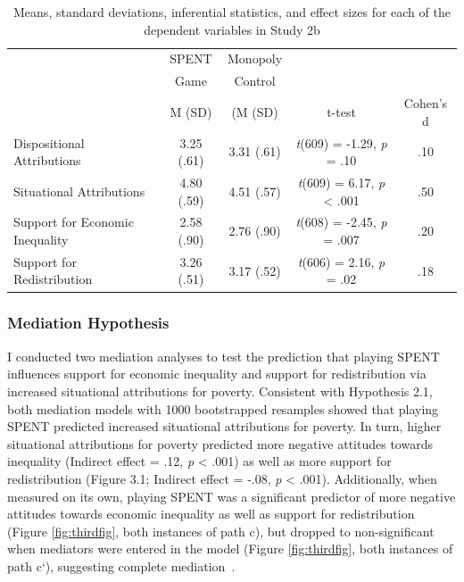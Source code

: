 \documentclass{sfuthesis}
\begin{document}
\begin{table}[h]
  \begin{center}
    \caption{Means, standard deviations, inferential statistics, and effect sizes for each of the dependent variables in Study 2b}
    \label{tab:fourthtable}
    \begin{tabular}{l c c c c}
    \hline
      & \multicolumn{1}{c}{SPENT} & \multicolumn{1}{c}{Monopoly} & & \\
      & \multicolumn{1}{c}{Game} & \multicolumn{1}{c}{Control} & & \\\cmidrule{2-3}
      & \multicolumn{1}{c}{M (SD)} & \multicolumn{1}{c}{(M (SD)} & t-test & Cohen's d\\
      \hline
      Dispositional Attributions & \multicolumn{1}{c}{3.25 (.61)} & \multicolumn{1}{c}{3.31 (.61)} & \multicolumn{1}{c}{\textit{t}(609) = -1.29, \textit{p} = .10} & .10\\
      Situational Attributions & \multicolumn{1}{c}{4.80 (.59)} & \multicolumn{1}{c}{4.51 (.57)} & \multicolumn{1}{c}{\textit{t}(609) = 6.17, \textit{p} < .001} & .50\\
      Support for Economic Inequality & \multicolumn{1}{c}{2.58 (.90)} & \multicolumn{1}{c}{2.76 (.90)} & \multicolumn{1}{c}{\textit{t}(608) = -2.45, \textit{p} = .007} & .20\\
      Support for Redistribution & \multicolumn{1}{c}{3.26 (.51)} & \multicolumn{1}{c}{3.17 (.52)} & \multicolumn{1}{c}{\textit{t}(606) = 2.16, \textit{p} = .02} & .18\\
      \hline
    \end{tabular}
  \end{center}
\end{table}

\subsubsection{Mediation Hypothesis}

I conducted two mediation analyses to test the prediction that playing SPENT influences support for economic inequality and support for redistribution via increased situational attributions for poverty. Consistent with Hypothesis 2.1, both mediation models with 1000 bootstrapped resamples showed that playing SPENT predicted increased situational attributions for poverty. In turn, higher situational attributions for poverty predicted more negative attitudes towards inequality (Indirect effect = .12, \textit{p} < .001) as well as more support for redistribution (Figure 3.1; Indirect effect = -.08, \textit{p} < .001). Additionally, when measured on its own, playing SPENT was a significant predictor of more negative attitudes towards economic inequality as well as support for redistribution (Figure \ref{fig:thirdfig}, both instances of path c), but dropped to non-significant when mediators were entered in the model (Figure \ref{fig:thirdfig}, both instances of path c`), suggesting complete mediation~\cite{baron86, rucker11}. 
\end{document}
